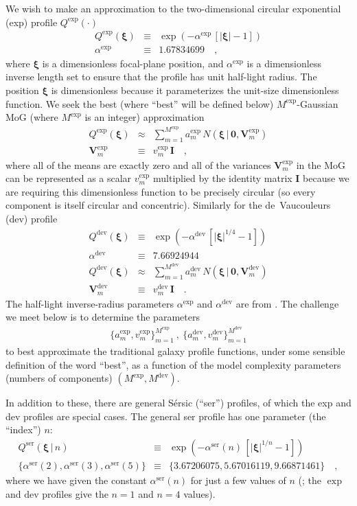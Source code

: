 \documentclass[12pt,pdftex,preprint]{aastex}
\newcommand{\tmatrix}[1]{\boldsymbol{#1}}
\newcommand{\tvector}[1]{\boldsymbol{#1}}
\newcommand{\spos}{\tvector{\xi}}
\newcommand{\var}{\tmatrix{V}}
\newcommand{\zero}{\tmatrix{0}}
\newcommand{\identity}{\tmatrix{I}}
\newcommand{\normal}{N}
\newcommand{\given}{\,|\,}
\newcommand{\dev}{\mathrm{dev}}
\newcommand{\ser}{\mathrm{ser}}
\begin{document}
We wish to make an approximation to the two-dimensional circular
exponential (exp) profile $Q^{\exp}(\cdot)$
\begin{eqnarray}\displaystyle
Q^{\exp}(\spos) &\equiv& \exp(-\alpha^{\exp}\,[|\spos| - 1])
\\
\alpha^{\exp} &\equiv& 1.67834699
\quad ,
\end{eqnarray}
where $\spos$ is a dimensionless focal-plane position, and
$\alpha^{\exp}$ is a dimensionless inverse length set to ensure that
the profile has unit half-light radius.  The position $\spos$ is
dimensionless because it parameterizes the unit-size dimensionless
function.  We seek the best (where ``best'' will be defined below)
$M^{\exp}$-Gaussian MoG (where $M^{\exp}$ is an integer) approximation
\begin{eqnarray}\displaystyle
Q^{\exp}(\spos) &\approx& \sum_{m=1}^{M^{\exp}} a^{\exp}_m\,\normal(\spos\given\zero,\var^{\exp}_m)
\\
\var^{\exp}_m &\equiv& v^{\exp}_m\,\identity
\quad ,
\end{eqnarray}
where all of the means are exactly zero and all of the variances
$\var^{\exp}_m$ in the MoG can be represented as a scalar
$v^{\exp}_m$ multiplied by the identity matrix $\identity$
because we are requiring this dimensionless function to be precisely
circular (so every component is itself circular and concentric).
Similarly for the de~Vaucouleurs (dev) profile
\begin{eqnarray}\displaystyle
Q^{\dev}(\spos) &\equiv& \exp(-\alpha^{\dev}\,[|\spos|^{1/4} - 1])
\\
\alpha^{\dev} &\equiv& 7.66924944
\\
Q^{\dev}(\spos) &\approx& \sum_{m=1}^{M^{\dev}} a^{\dev}_m\,\normal(\spos\given\zero,\var^{\dev}_m)
\\
\var^{\dev}_m &\equiv& v^{\dev}_m\,\identity
\quad .
\end{eqnarray}
The half-light inverse-radius parameters $\alpha^{\exp}$ and
$\alpha^{\dev}$ are from \citet{ciotti}.  The challenge we
meet below is to determine the parameters
\begin{eqnarray}
\{a^{\exp}_m,v^{\exp}_m\}_{m=1}^{M^{\exp}}~,~\{a^{\dev}_m,v^{\dev}_m\}_{m=1}^{M^{\dev}}
\end{eqnarray}
to best approximate the traditional galaxy profile functions, under
some sensible definition of the word ``best'', as a function of the
model complexity parameters (numbers of components) $(M^{\exp},
M^{\dev})$.

In addition to these, there are general S\'ersic (``ser'') profiles, of
which the exp and dev profiles are special cases.  The general ser
profile has one parameter (the ``index'') $n$:
\begin{eqnarray}\displaystyle
Q^{\ser}(\spos\given n) &\equiv& \exp(-\alpha^{\ser}(n)\,[|\spos|^{1/n} - 1])
\\
\{\alpha^{\ser}(2), \alpha^{\ser}(3), \alpha^{\ser}(5)\} &\equiv& \{3.67206075, 5.67016119, 9.66871461\}
\quad ,
\end{eqnarray}
where we have given the constant $\alpha^{\ser}(n)$ for just a few
values of $n$ (\citealt{ciotti}; the $\exp$ and $\dev$ profiles give
the $n=1$ and $n=4$ values).
\end{document}

